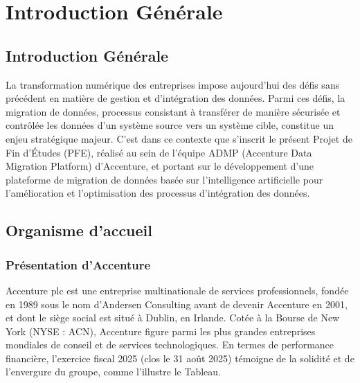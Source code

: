 %
\chapter{Introduction Générale}
\section{Introduction Générale}
\label{chap:introduction}

La transformation numérique des entreprises impose aujourd'hui des défis sans précédent en matière de gestion et d'intégration des données. Parmi ces défis, la migration de données, processus consistant à transférer de manière sécurisée et contrôlée les données d'un système source vers un système cible, constitue un enjeu stratégique majeur. C'est dans ce contexte que s'inscrit le présent Projet de Fin d'Études (PFE), réalisé au sein de l'équipe ADMP (Accenture Data Migration Platform) d'Accenture, et portant sur le développement d'une plateforme de migration de données basée sur l'intelligence artificielle pour l'amélioration et l'optimisation des processus d'intégration des données.

\section{Organisme d'accueil}
\label{sec:organisme}



\subsection{Présentation d'Accenture}
\label{subsec:accenture}

Accenture plc est une entreprise multinationale de services professionnels, fondée en 1989 sous le nom d'Andersen Consulting avant de devenir Accenture en 2001, et dont le siège social est situé à Dublin, en Irlande. Cotée à la Bourse de New York (NYSE : ACN), Accenture figure parmi les plus grandes entreprises mondiales de conseil et de services technologiques.
En termes de performance financière, l'exercice fiscal 2025 (clos le 31 août 2025) témoigne de la solidité et de l'envergure du groupe, comme l'illustre le Tableau.

